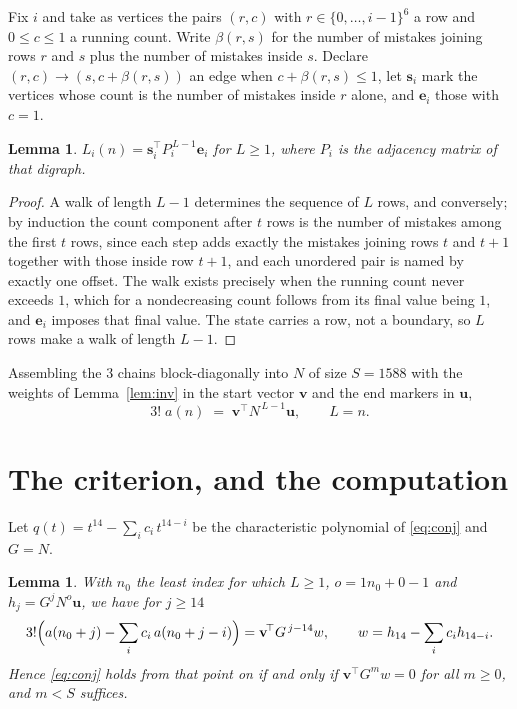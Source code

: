 \documentclass[11pt,a4paper]{article}
\theoremstyle{plain}
\newtheorem{lemma}[theorem]{Lemma}
\theoremstyle{definition}
\begin{document}
Fix $i$ and take as vertices the pairs $(r,c)$ with $r\in\{0,\dots,i-1\}^{6}$ a row
and $0\le c\le1$ a running count. Write $\beta(r,s)$ for the number of mistakes joining
rows $r$ and $s$ plus the number of mistakes inside $s$. Declare $(r,c)\to(s,c+\beta(r,s))$
an edge when $c+\beta(r,s)\le1$, let $\mathbf{s}_i$ mark the vertices whose count is the
number of mistakes inside $r$ alone, and $\mathbf{e}_i$ those with $c=1$.

\begin{lemma}\label{lem:walk}
$L_i(n)=\mathbf{s}_i^{\!\top}P_i^{\,L-1}\mathbf{e}_i$ for $L\ge1$, where $P_i$ is the
adjacency matrix of that digraph.
\end{lemma}

\begin{proof}
A walk of length $L-1$ determines the sequence of $L$ rows, and conversely; by induction
the count component after $t$ rows is the number of mistakes among the first $t$ rows,
since each step adds exactly the mistakes joining rows $t$ and $t+1$ together with those
inside row $t+1$, and each unordered pair is named by exactly one offset. The walk exists
precisely when the running count never exceeds $1$, which for a nondecreasing count follows
from its final value being $1$, and $\mathbf{e}_i$ imposes that final value. The state
carries a row, not a boundary, so $L$ rows make a walk of length $L-1$.
\end{proof}

Assembling the $3$ chains block-diagonally into $N$ of size $S=1588$ with the weights of
Lemma~\ref{lem:inv} in the start vector $\mathbf{v}$ and the end markers in
$\mathbf{u}$,
\begin{equation}\label{eq:walk2}
3!\;a(n)\;=\;\mathbf{v}^{\!\top}N^{\,L-1}\mathbf{u},\qquad L=n .
\end{equation}

\section{The criterion, and the computation}

Let $q(t)=t^{14}-\sum_i c_i\,t^{14-i}$ be the characteristic polynomial of
\eqref{eq:conj} and $G=N$.

\begin{lemma}\label{lem:crit}
With $n_0$ the least index for which $L\ge1$, $o=1n_0+0-1$ and
$h_j=G^{j}N^{o}\mathbf{u}$, we have for $j\ge14$
\[
3!\Bigl(a(n_0+j)-\sum_i c_i\,a(n_0+j-i)\Bigr)=\mathbf{v}^{\!\top}G^{\,j-14}w,
\qquad w=h_{14}-\sum_i c_ih_{14-i} .
\]
Hence \eqref{eq:conj} holds from that point on if and only if
$\mathbf{v}^{\!\top}G^{m}w=0$ for all $m\ge0$, and $m<S$ suffices.
\end{lemma}
\end{document}
